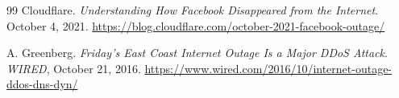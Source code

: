 \documentclass[11pt]{article}
\begin{document}
\begin{thebibliography}{99}
    Cloudflare.
    \newblock \emph{Understanding How Facebook Disappeared from the Internet}.
    \newblock October 4, 2021.
    \newblock \url{https://blog.cloudflare.com/october-2021-facebook-outage/}
    
    A. Greenberg.
    \newblock \emph{Friday's East Coast Internet Outage Is a Major DDoS Attack}.
    \newblock \emph{WIRED}, October 21, 2016.
    \newblock \url{https://www.wired.com/2016/10/internet-outage-ddos-dns-dyn/}
    
    \end{thebibliography}
\end{document}
